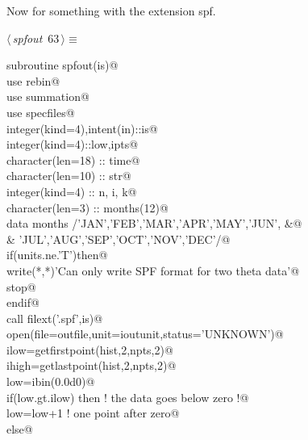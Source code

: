 \documentclass[10pt,a4paper,notitlepage]{article}
\begin{document}
Now for something with the extension spf. 
\begin{flushleft} \small
\begin{minipage}{\linewidth}\label{scrap67}\raggedright\small
{} $\langle\,${\it spfout}\nobreak\ {\footnotesize {63}}$\,\rangle\equiv$
\vspace{-1ex}
\begin{list}{}{} \item
\mbox{}\verb@      subroutine spfout(is)@\\
\mbox{}\verb@      use rebin@\\
\mbox{}\verb@      use summation@\\
\mbox{}\verb@      use specfiles@\\
\mbox{}\verb@      integer(kind=4),intent(in)::is@\\
\mbox{}\verb@      integer(kind=4)::low,ipts@\\
\mbox{}\verb@      character(len=18) :: time@\\
\mbox{}\verb@      character(len=10) :: str@\\
\mbox{}\verb@      integer(kind=4) :: n, i, k@\\
\mbox{}\verb@      character(len=3) :: months(12)@\\
\mbox{}\verb@      data months /'JAN','FEB','MAR','APR','MAY','JUN',                 &@\\
\mbox{}\verb@     &             'JUL','AUG','SEP','OCT','NOV','DEC'/@\\
\mbox{}\verb@      if(units.ne.'T')then@\\
\mbox{}\verb@        write(*,*)'Can only write SPF format for two theta data'@\\
\mbox{}\verb@        stop@\\
\mbox{}\verb@      endif@\\
\mbox{}\verb@      call filext('.spf',is)@\\
\mbox{}\verb@      open(file=outfile,unit=ioutunit,status='UNKNOWN')@\\
\mbox{}\verb@      ilow=getfirstpoint(hist,2,npts,2)@\\
\mbox{}\verb@      ihigh=getlastpoint(hist,2,npts,2)@\\
\mbox{}\verb@      low=ibin(0.0d0)@\\
\mbox{}\verb@      if(low.gt.ilow) then ! the data goes below zero !@\\
\mbox{}\verb@       low=low+1           ! one point after zero@\\
\mbox{}\verb@      else@\\

\end{list}
\end{minipage}
\end{flushleft}
\end{document}
